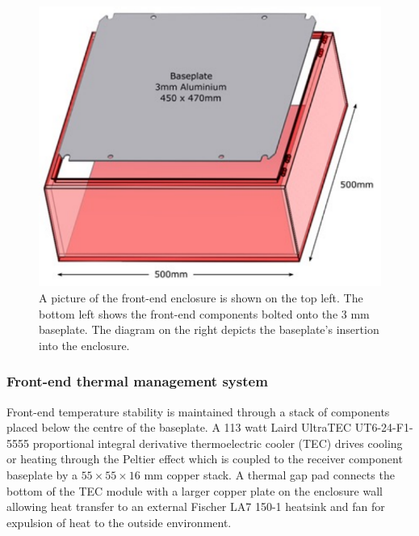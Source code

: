 \begin{figure}
\begin{minipage}{.4\textwidth}
    \end{minipage}
    \begin{minipage}{.4\textwidth}
        \centering
        \includegraphics[scale=0.57]{enclosure_plate}
    \end{minipage}
    \caption{A picture of the front-end enclosure is shown on the top left. The bottom left shows the front-end components bolted onto the 3 mm baseplate. The diagram on the right depicts the baseplate's insertion into the enclosure.}
    \label{fig:enclosure_plate}
\end{figure}


\subsubsection{Front-end thermal management system}
Front-end temperature stability is maintained through a stack of components placed below the centre of the baseplate. A 113 watt Laird UltraTEC UT6-24-F1-5555 proportional integral derivative thermoelectric cooler (TEC) drives cooling or heating through the Peltier effect which is coupled to the receiver component baseplate by a $55 \times 55 \times 16$ mm copper stack. A thermal gap pad connects the bottom of the TEC module with a larger copper plate on the enclosure wall allowing heat transfer to an external Fischer LA7 150-1 heatsink and fan for expulsion of heat to the outside environment.

